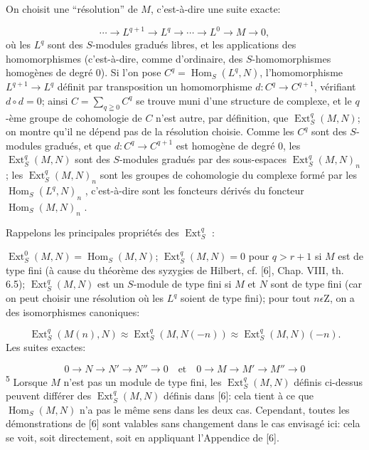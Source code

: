 On choisit une ``résolution'' de $M$, c'est-à-dire une suite exacte:

\begin{equation*}
\cdots \to L^{q+1} \to L^q \to \cdots \to L^0 \to M \to 0,
\end{equation*}
où les $L^q$ sont des $S$-modules gradués libres, et les applications des homomorphismes (c'est-à-dire, comme d'ordinaire, des $S$-homomorphismes homogènes de degré 0). Si l'on pose $C^q = \operatorname{Hom}_S(L^q, N)$, l'homomorphisme $L^{q+1} \to L^q$ définit par transposition un homomorphisme $d:C^q \to C^{q+1}$, vérifiant $d \circ d = 0$; ainsi $C = \sum\nolimits_{q \geqq 0} C^q$ se trouve muni d'une structure de complexe, et le $q$-ème groupe de cohomologie de $C$ n'est autre, par définition, que $\operatorname{Ext}_S^q(M, N)$; on montre qu'il ne dépend pas de la résolution choisie. Comme les $C^q$ sont des $S$-modules gradués, et que $d:C^q \to C^{q+1}$ est homogène de degré 0, les $\operatorname{Ext}_S^q(M, N)$ sont des $S$-modules gradués par des sous-espaces $\operatorname{Ext}_S^q(M, N)_n$ ; les $\operatorname{Ext}_S^q(M, N)_n$ sont les groupes de cohomologie du complexe formé par les $\operatorname{Hom}_S(L^q, N)_n$ , c'est-à-dire sont les foncteurs dérivés du foncteur $\operatorname{Hom}_S(M, N)_n$ .

Rappelons les principales propriétés des $\operatorname{Ext}_S^q$ :

$\operatorname{Ext}_S^0(M, N) = \operatorname{Hom}_S(M, N)$; $\operatorname{Ext}_S^q(M, N) = 0$ pour $q > r + 1$ si $M$ est de type fini (à cause du théorème des syzygies de Hilbert, cf. [6], Chap. VIII, th. 6.5); $\operatorname{Ext}_S^q(M, N)$ est un $S$-module de type fini si $M$ et $N$ sont de type fini (car on peut choisir une résolution où les $L^q$ soient de type fini); pour tout $n \epsilon \mathrm{Z}$, on a des isomorphismes canoniques:

\begin{equation*}
\operatorname{Ext}_S^q(M(n), N) \approx \operatorname{Ext}_S^q(M, N(-n)) \approx \operatorname{Ext}_S^q(M, N)(-n).
\end{equation*}
Les suites exactes:

\begin{equation*}
0 \to N \to N' \to N'' \to 0 \quad \mathrm{et} \quad 0 \to M \to M' \to M'' \to 0 
\end{equation*}
\textsuperscript{5} Lorsque $M$ n'est pas un module de type fini, les $\operatorname{Ext}_S^q (M, N)$ définis ci-dessus peuvent différer des $\operatorname{Ext}_S^q (M, N)$ définis dans [6]: cela tient à ce que $\operatorname{Hom}_S (M, N)$ n'a pas le même sens dans les deux cas. Cependant, toutes les démonstrations de [6] sont valables sans changement dans le cas envisagé ici: cela se voit, soit directement, soit en appliquant l'Appendice de [6].


